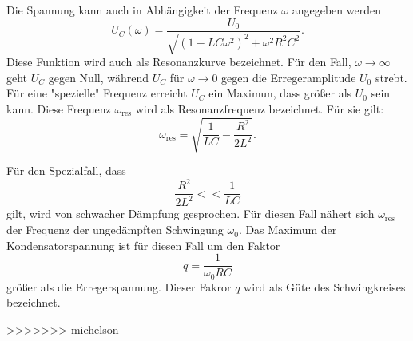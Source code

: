 Die Spannung kann auch in Abhängigkeit der Frequenz $\omega$ angegeben werden
\begin{equation}
  U_{C}(\omega)=\frac{U_{0}}{\sqrt{(1-LC\omega^2)^2+\omega^2R^2C^2}}.
\end{equation}
Diese Funktion wird auch als Resonanzkurve bezeichnet. Für den Fall,
$\omega \to \infty$ geht $U_{C}$ gegen Null, während $U_{C}$ für
$\omega \to 0$ gegen die Erregeramplitude $U_{0}$ strebt.
Für eine "spezielle" Frequenz erreicht $U_{C}$ ein Maximun, dass größer
als $U_{0}$ sein kann. Diese Frequenz $\omega_{\text{res}}$ wird als Resonanzfrequenz
bezeichnet. Für sie gilt:
\begin{equation}
  \omega_{\text{res}}=\sqrt{\frac{1}{LC}-\frac{R^2}{2L^2}}.
\end{equation}

Für den Spezialfall, dass
\begin{equation}
  \frac{R^2}{2L^2}<<\frac{1}{LC}
\end{equation}
gilt, wird von schwacher Dämpfung gesprochen. Für diesen Fall nähert sich
$\omega_{\text{res}}$ der Frequenz der ungedämpften Schwingung $\omega_{0}$.
Das Maximum der Kondensatorspannung ist für diesen Fall um den Faktor
\begin{equation}
  q=\frac{1}{\omega_{0}RC}
  \label{eqn:gute}
\end{equation}
größer als die Erregerspannung. Dieser Fakror $q$ wird als Güte des Schwingkreises
bezeichnet.



\label{sec:Theorie}

>>>>>>> michelson
